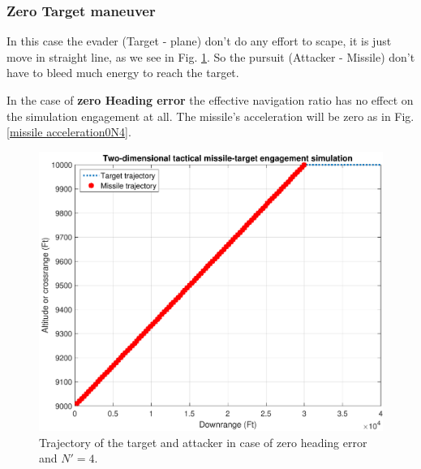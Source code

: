 \subsubsection{Zero Target maneuver}
In this case the evader (Target - plane) don't do any effort to scape, it is just move in straight line, as we see in Fig. \ref{trajectory0N4}. So the pursuit (Attacker - Missile) don't have to bleed much energy to reach the target.

In the case of \textbf{zero Heading error} the effective navigation ratio has no effect on the simulation engagement at all. The missile's acceleration will be zero as in Fig. \ref{missile acceleration0N4}.

\begin{figure}[htb]
	\centering
	\includegraphics[scale = 0.75]{fig/trajectory0N4.pdf}
	\caption{Trajectory of the target and attacker in case of zero heading error and $N'=4$.}
	\label{trajectory0N4}
\end{figure}


